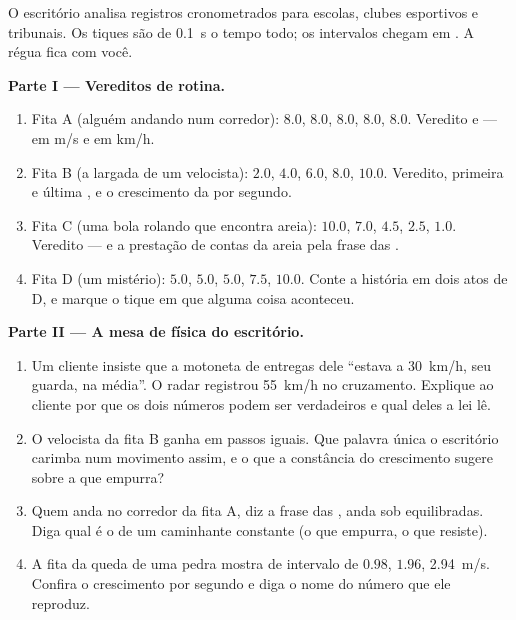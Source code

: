 \begin{problem}\label{pb:g9:uniform-varied-motion:1}
O escritório analisa registros cronometrados para escolas, clubes
esportivos e tribunais. Os tiques são de \qty{0.1}{s} o tempo todo; os
intervalos chegam em . A régua fica com você.

\medskip\noindent\textbf{Parte I --- Vereditos de rotina.}
\begin{enumerate}
  \item Fita A (alguém andando num corredor): $8.0$, $8.0$, $8.0$,
        $8.0$, $8.0$. Veredito e  --- em \unit{m/s} e em
        \unit{km/h}.
  \item Fita B (a largada de um velocista): $2.0$, $4.0$, $6.0$,
        $8.0$, $10.0$. Veredito, primeira e última , e o
        crescimento da  por segundo.
  \item Fita C (uma bola rolando que encontra areia): $10.0$, $7.0$,
        $4.5$, $2.5$, $1.0$. Veredito --- e a prestação de contas da
        areia pela frase das .
  \item Fita D (um mistério): $5.0$, $5.0$, $5.0$, $7.5$, $10.0$.
        Conte a história em dois atos de D, e marque o tique em que
        alguma coisa aconteceu.
\end{enumerate}

\medskip\noindent\textbf{Parte II --- A mesa de física do
escritório.}
\begin{enumerate}[resume]
  \item Um cliente insiste que a motoneta de entregas dele ``estava a
        \qty{30}{km/h}, seu guarda, na média''. O radar registrou
        \qty{55}{km/h} no cruzamento. Explique ao cliente por que os
        dois números podem ser verdadeiros e qual deles a lei lê.
  \item O velocista da fita B ganha  em passos iguais. Que
        palavra única o escritório carimba num movimento assim, e o
        que a constância do crescimento sugere sobre a  que
        empurra?
  \item Quem anda no corredor da fita A, diz a frase das , anda
        sob  equilibradas. Diga qual é o  de um
        caminhante constante (o que empurra, o que resiste).
  \item A fita da queda de uma pedra mostra  de intervalo
        de $0.98$, $1.96$, \qty{2.94}{m/s}. Confira o crescimento por
        segundo e diga o nome do número que ele reproduz.
\end{enumerate}


\end{problem}
